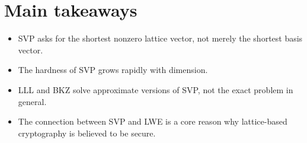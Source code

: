 \section{Main takeaways}

\begin{itemize}
    \item SVP asks for the shortest nonzero lattice vector, not merely the shortest basis vector.
    \item The hardness of SVP grows rapidly with dimension.
    \item LLL and BKZ solve approximate versions of SVP, not the exact problem in general.
    \item The connection between SVP and LWE is a core reason why lattice-based cryptography is believed to be secure.
\end{itemize}

\printbibliography[heading=chapterrefs]
